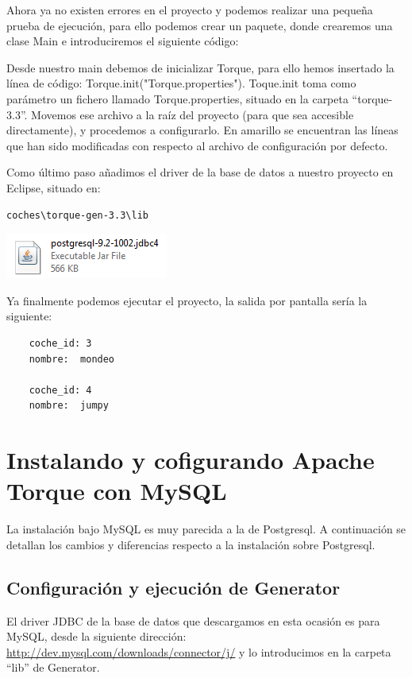 \documentclass[12pt, oneside]{article}
\begin{document}
	Ahora ya no existen errores en el proyecto y podemos realizar una pequeña prueba de ejecución, para ello podemos crear un paquete, donde crearemos una clase Main e introduciremos el siguiente código:
	
	
	
	Desde nuestro main debemos de inicializar Torque, para ello hemos insertado la línea de código: Torque.init("Torque.properties"). Toque.init toma como parámetro un fichero llamado Torque.properties, situado en la carpeta “torque-3.3”. Movemos ese archivo a la raíz del proyecto (para que sea accesible directamente), y procedemos a configurarlo. En amarillo se encuentran las líneas que han sido modificadas con respecto al archivo de configuración por defecto.
	
	
	
	Como último paso añadimos el driver de la base de datos a nuestro proyecto en Eclipse, situado en:
	
\begin{lstlisting}
coches\torque-gen-3.3\lib
\end{lstlisting}

	\begin{center}
		\includegraphics{img/postgresql-file.png}
	\end{center}

	Ya finalmente podemos ejecutar el proyecto, la salida por pantalla sería la siguiente: 
	
	\begin{lstlisting}
	coche_id: 3
	nombre:  mondeo

	coche_id: 4
	nombre:  jumpy
	\end{lstlisting}
	
\section{Instalando y cofigurando Apache Torque con MySQL}
La instalación bajo MySQL es muy parecida a la de Postgresql. A continuación se detallan los cambios y diferencias respecto a la instalación sobre Postgresql.

\subsection{Configuración y ejecución de Generator}
El driver JDBC de la base de datos que descargamos en esta ocasión es para MySQL, desde la siguiente dirección: \url{http://dev.mysql.com/downloads/connector/j/} y lo introducimos en la carpeta “lib” de Generator.
\end{document}
